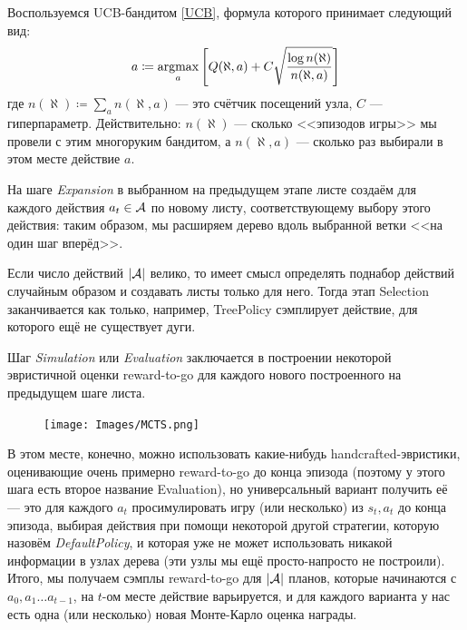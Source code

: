 \begin{example} Воспользуемся UCB-бандитом \eqref{UCB}, формула которого принимает следующий вид:
$$a \coloneqq \mathop{\mathrm{argmax}}_a \left[ Q(\aleph, a) + C \sqrt{\frac{\log n(\aleph)}{n(\aleph, a)}}\right]$$
где $n(\aleph) \coloneqq \sum\limits_a n(\aleph, a)$ --- это счётчик посещений узла, $C$ --- гиперпараметр. Действительно: $n(\aleph)$ --- сколько <<эпизодов игры>> мы провели с этим многоруким бандитом, а $n(\aleph, a)$ --- сколько раз выбирали в этом месте действие $a$. 
\end{example}

\begin{definition}
    На шаге \emph{Expansion} в выбранном на предыдущем этапе листе создаём для каждого действия $a_t \HM\in \A$ по новому листу, соответствующему выбору этого действия: таким образом, мы расширяем дерево вдоль выбранной ветки <<на один шаг вперёд>>.
\end{definition}

\begin{remark}
Если число действий $|\mathcal{A}|$ велико, то имеет смысл определять поднабор действий случайным образом и создавать листы только для него. Тогда этап Selection заканчивается как только, например, TreePolicy сэмплирует действие, для которого ещё не существует дуги.
\end{remark}

\begin{definition}
    Шаг \emph{Simulation} или \emph{Evaluation} заключается в построении некоторой эвристичной оценки reward-to-go для каждого нового построенного на предыдущем шаге листа.
\end{definition}

\begin{figure}
\vspace{-0.3cm}
\centering
\texttt{[image: Images/MCTS.png]}
\vspace{-0.3cm}
\end{figure}

В этом месте, конечно, можно использовать какие-нибудь handcrafted-эвристики, оценивающие очень примерно reward-to-go до конца эпизода (поэтому у этого шага есть второе название Evaluation), но универсальный вариант получить её --- это для каждого $a_t$ просимулировать игру (или несколько) из $s_t, a_t$ до конца эпизода, выбирая действия при помощи некоторой другой стратегии, которую назовём \emph{DefaultPolicy}, и которая уже не может использовать никакой информации в узлах дерева (эти узлы мы ещё просто-напросто не построили). Итого, мы получаем сэмплы reward-to-go для $|\mathcal{A}|$ планов, которые начинаются с $a_0, a_1 \dots a_{t-1}$, на $t$-ом месте действие варьируется, и для каждого варианта у нас есть одна (или несколько) новая Монте-Карло оценка награды.

